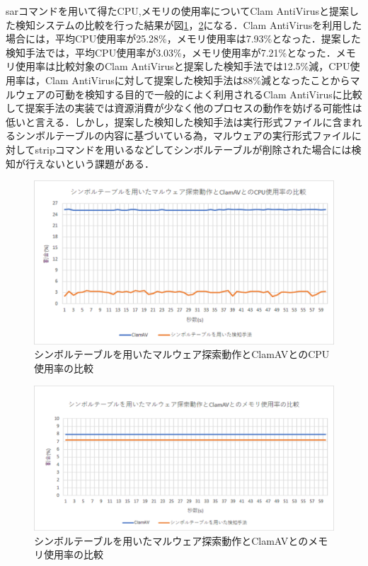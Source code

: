 
sarコマンドを用いて得たCPU,メモリの使用率についてClam AntiVirusと提案した検知システムの比較を行った結果が図\ref{fig:symbol_cpu}，\ref{fig:symbol_mem}になる．Clam AntiVirusを利用した場合には，平均CPU使用率が25.28\%，メモリ使用率は7.93\%となった．提案した検知手法では，平均CPU使用率が3.03\%，メモリ使用率が7.21\%となった．メモリ使用率は比較対象のClam AntiVirusと提案した検知手法では12.5\%減，CPU使用率は，Clam AntiVirusに対して提案した検知手法は88\%減となったことからマルウェアの可動を検知する目的で一般的によく利用されるClam AntiVirusに比較して提案手法の実装では資源消費が少なく他のプロセスの動作を妨げる可能性は低いと言える．しかし，提案した検知した検知手法は実行形式ファイルに含まれるシンボルテーブルの内容に基づいている為，マルウェアの実行形式ファイルに対してstripコマンドを用いるなどしてシンボルテーブルが削除された場合には検知が行えないという課題がある．

\begin{figure}[h]
 \centering
    \includegraphics[width=120mm]{figures/cpu.eps}
 \caption{シンボルテーブルを用いたマルウェア探索動作とClamAVとのCPU使用率の比較}
 \label{fig:symbol_cpu}
 \end{figure}
 
 
\begin{figure}[h]
 \centering
    \includegraphics[width=120mm]{figures/mem.eps}
   \caption{シンボルテーブルを用いたマルウェア探索動作とClamAVとのメモリ使用率の比較}
    \label{fig:symbol_mem}
 \end{figure}
